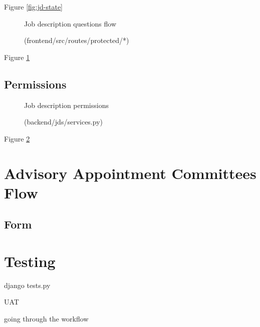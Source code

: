 Figure \ref{fig:jd-state}

\begin{figure}[h]
\centering
{}
\vspace{-5pt}
\caption{Job description questions flow}
\vspace{-10pt}
\caption*{(frontend/src/routes/protected/*)}
\label{fig:jd-q-flow}
\vspace{-5pt}
\end{figure}

Figure \ref{fig:jd-q-flow}

\subsection{Permissions}
\begin{figure}[h]
\centering
{}
\vspace{-5pt}
\caption{Job description permissions}
\vspace{-10pt}
\caption*{(backend/jds/services.py)}
\label{fig:jd-perms}
\vspace{-5pt}
\end{figure}

Figure \ref{fig:jd-perms}

\section{Advisory Appointment Committees Flow}

\subsection{Form}

\section{Testing}

django tests.py

UAT

going through the workflow
